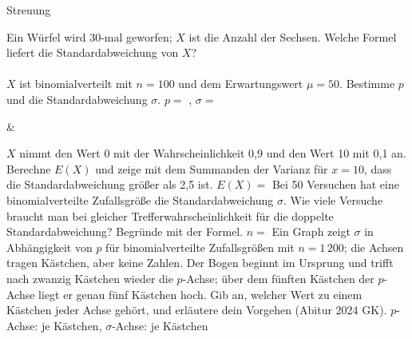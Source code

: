 \setcounter{aufgabe}{22}

\begin{aufgabe}{Streuung}
\begin{teile}
\teil Ein Würfel wird 30-mal geworfen; $X$ ist die Anzahl der Sechsen. Welche Formel liefert die Standardabweichung von $X$? \\  \\ 
\teil $X$ ist binomialverteilt mit $n = 100$ und dem Erwartungswert $\mu = 50$. Bestimme $p$ und die Standardabweichung $\sigma$. $p = $ \leerfeld , $\sigma = $ \leerfeld
\end{teile}
\begin{gleichungsraster}[2]
 &
\end{gleichungsraster}
\begin{teile}
\teil $X$ nimmt den Wert 0 mit der Wahrscheinlichkeit 0{,}9 und den Wert 10 mit 0{,}1 an. Berechne $E(X)$ und zeige mit dem Summanden der Varianz für $x = 10$, dass die Standardabweichung größer als 2{,}5 ist. $E(X) = $ \leerfeld
\teil Bei 50 Versuchen hat eine binomialverteilte Zufallsgröße die Standardabweichung $\sigma$. Wie viele Versuche braucht man bei gleicher Trefferwahrscheinlichkeit für die doppelte Standardabweichung? Begründe mit der Formel. $n = $ \leerfeld
\teil Ein Graph zeigt $\sigma$ in Abhängigkeit von $p$ für binomialverteilte Zufallsgrößen mit $n = 1\,200$; die Achsen tragen Kästchen, aber keine Zahlen. Der Bogen beginnt im Ursprung und trifft nach zwanzig Kästchen wieder die $p$-Achse; über dem fünften Kästchen der $p$-Achse liegt er genau fünf Kästchen hoch. Gib an, welcher Wert zu einem Kästchen jeder Achse gehört, und erläutere dein Vorgehen \hfill (Abitur 2024 GK). $p$-Achse: \leerfeld je Kästchen, $\sigma$-Achse: \leerfeld je Kästchen
\end{teile}
\end{aufgabe}

